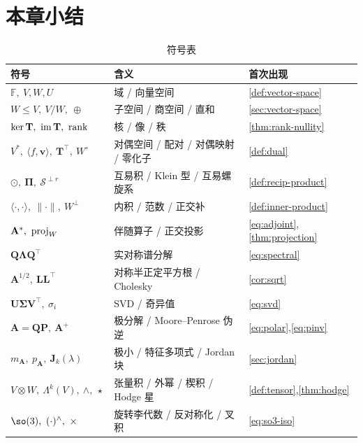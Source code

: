 \section*{本章小结}

\begin{table}[H]\centering\small
\caption{符号表}
\begin{tabular}{lll}
\toprule
符号 & 含义 & 首次出现 \\
\midrule
$\mathbb{F},\ V,W,U$ & 域 / 向量空间 & \cref{def:vector-space} \\
$W\le V,\ V/W,\ \oplus$ & 子空间 / 商空间 / 直和 & \cref{sec:vector-space} \\
$\ker\mathbf{T},\ \im\mathbf{T},\ \mathrm{rank}$ & 核 / 像 / 秩 & \cref{thm:rank-nullity} \\
$V^*,\ \langle f,\mathbf{v}\rangle,\ \mathbf{T}^\top,\ W^\circ$ & 对偶空间 / 配对 / 对偶映射 / 零化子 & \cref{def:dual} \\
$\odot,\ \boldsymbol{\Pi},\ \mathcal{S}^{\perp r}$ & 互易积 / Klein 型 / 互易螺旋系 & \cref{def:recip-product} \\
$\langle\cdot,\cdot\rangle,\ \|\cdot\|,\ W^\perp$ & 内积 / 范数 / 正交补 & \cref{def:inner-product} \\
$\mathbf{A}^*,\ \proj_W$ & 伴随算子 / 正交投影 & \cref{eq:adjoint},\cref{thm:projection} \\
$\mathbf{Q}\boldsymbol{\Lambda}\mathbf{Q}^\top$ & 实对称谱分解 & \cref{eq:spectral} \\
$\mathbf{A}^{1/2},\ \mathbf{L}\mathbf{L}^\top$ & 对称半正定平方根 / Cholesky & \cref{cor:sqrt} \\
$\mathbf{U}\boldsymbol{\Sigma}\mathbf{V}^\top,\ \sigma_i$ & SVD / 奇异值 & \cref{eq:svd} \\
$\mathbf{A}=\mathbf{Q}\mathbf{P},\ \mathbf{A}^+$ & 极分解 / Moore--Penrose 伪逆 & \cref{eq:polar},\cref{eq:pinv} \\
$m_{\mathbf{A}},\ p_{\mathbf{A}},\ \mathbf{J}_k(\lambda)$ & 极小 / 特征多项式 / Jordan 块 & \cref{sec:jordan} \\
$V\otimes W,\ \Lambda^k(V),\ \wedge,\ \star$ & 张量积 / 外幂 / 楔积 / Hodge 星 & \cref{def:tensor},\cref{thm:hodge} \\
$\so(3),\ (\cdot)^\wedge,\ \times$ & 旋转李代数 / 反对称化 / 叉积 & \cref{eq:so3-iso} \\
\bottomrule
\end{tabular}
\end{table}

